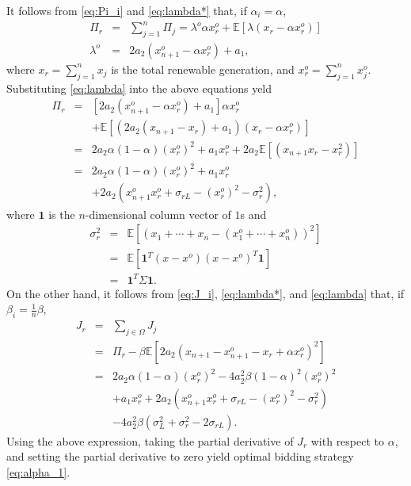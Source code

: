 \documentclass[conference]{IEEEtran}
\newcommand{\one}{\mathbf{1}}
\begin{document}
 It follows from \eqref{eq:Pi_i} and \eqref{eq:lambda*} that, if $\alpha_i=\alpha$, 
\begin{eqnarray*}
\Pi_r & = & \sum_{j=1}^n \Pi_j = \lambda^o \alpha x_r^o +  \mathbb{E}[\lambda (x_r-\alpha x_r^o)] \\
 \lambda^o   & = & 2a_2\left(x_{n+1}^o-\alpha x_r^o \right) +a_1,
\end{eqnarray*}
where $x_r = \sum_{j=1}^n x_j$ is the total renewable generation, and $x_r^o = \sum_{j=1}^n x_j^o$. Substituting \eqref{eq:lambda} into the above equations yeld
\begin{eqnarray}
\Pi_r & = &  [2a_2\left(x_{n+1}^o-\alpha x_r^o \right) +a_1] \alpha x_r^o \nonumber \\
&& + \mathbb{E}[(2a_2\left(x_{n+1}-x_r \right) + a_1)(x_r-\alpha x_r^o)] \nonumber \\
  & = & 2a_2\alpha(1-\alpha)(x_r^o)^2 +a_1x_r^o  + 2a_2\mathbb{E}[\left(x_{n+1}x_r-x_r^2 \right)] \nonumber\\
   & = & 2a_2\alpha(1-\alpha)(x_r^o)^2 +a_1x_r^o \nonumber \\
   && + 2a_2\left(x_{n+1}^ox_r^o+\sigma_{rL}-(x_r^o)^2-\sigma_r^2 \right), \label{eq:Pi_r_exp}
\end{eqnarray}
where $\one$ is the $n$-dimensional column vector of $1$s and 
\begin{eqnarray*}
    \sigma_r^2 & = & \mathbb{E}[(x_1+\cdots+x_n-(x_1^o+\cdots+x_n^o))^2] \\
    & = & \mathbb{E}[ \one^T (x-x^o)(x-x^o)^T\one] \\
    & = & \one^T \Sigma \one. 
\end{eqnarray*}
On the other hand, it follows from \eqref{eq:J_i}, \eqref{eq:lambda*}, and \eqref{eq:lambda} that, if $\beta_i = \frac{1}{n}\beta$,
\begin{eqnarray*}
J_r & = & \sum_{j\in\Omega} J_j \\
 & = & \Pi_r  - \beta \mathbb{E}[2a_2 (x_{n+1}-x_{n+1}^o -x_r +\alpha x_r^o)^2] \\
 & = & 2a_2\alpha(1-\alpha)(x_r^o)^2  - 4a_2^2  \beta  (1-\alpha)^2 (x_r^o)^2 \\
 & & +a_1x_r^o + 2a_2\left(x_{n+1}^ox_r^o+\sigma_{rL}-(x_r^o)^2-\sigma_r^2 \right)\\
 && - 4a_2^2  \beta (\sigma_L^2+\sigma_r^2 - 2\sigma_{rL}). 
\end{eqnarray*}
Using the above expression, taking the partial derivative of $J_r$ with respect to $\alpha$, and setting the partial derivative to zero yield optimal bidding strategy \eqref{eq:alpha_1}. 
\end{document}
